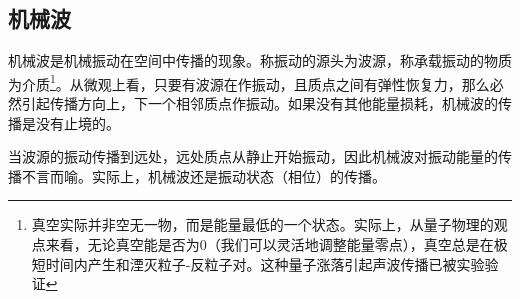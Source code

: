
\subsection{机械波}
机械波是机械振动在空间中传播的现象。称振动的源头为波源，称承载振动的物质为介质\footnote{真空实际并非空无一物，而是能量最低的一个状态。实际上，从量子物理的观点来看，无论真空能是否为0（我们可以灵活地调整能量零点），真空总是在极短时间内产生和湮灭粒子-反粒子对。这种量子涨落引起声波传播已被实验验证}。从微观上看，只要有波源在作振动，且质点之间有弹性恢复力，那么必然引起传播方向上，下一个相邻质点作振动。如果没有其他能量损耗，机械波的传播是没有止境的。

当波源的振动传播到远处，远处质点从静止开始振动，因此机械波对振动能量的传播不言而喻。实际上，机械波还是振动状态（相位）的传播。
